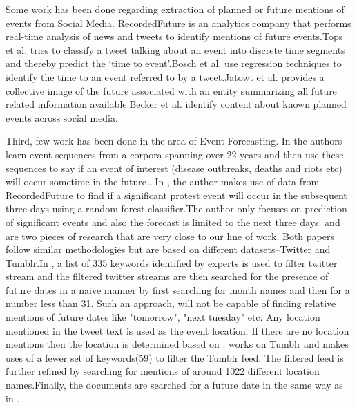 Some work has been done regarding extraction of planned or future mentions of events from Social Media. RecordedFuture\cite{recordedFuture}  is an analytics company that performs real-time analysis of news and tweets to identify mentions of future events.Tops et al.\cite{tops2013predicting} tries to classify a tweet talking about an event into discrete time segments and thereby predict the `time to event'.Bosch et al.\cite{bosch2013estm} use regression techniques to identify the time to an event referred to by a tweet.Jatowt et al. \cite{Jatowt:2011:ECE} provides a collective image of the future associated with an entity summarizing all future related information available.Becker et al.\cite{Becker:2012:ICP} identify content about known planned events across social media.

Third, few work has been done in the area of Event Forecasting. In \cite{Radinsky:2013:MWP} the authors learn event sequences from a corpora spanning over 22 years and then use these sequences to say if an event of interest (disease outbreaks, deaths and riots etc) will occur sometime in the future.\iffalse They only predict if an event of interest will happen in the future given the sequence of events seen but do not predict when/where(city level resolution) that event will happen \fi. In \cite{nathankallus}, the author makes use of data from RecordedFuture\cite{recordedFuture} to find if a  significant protest event will occur in the subsequent three days using a random forest classifier.The author only focuses on prediction of significant events and also the forecast is limited to the next three days.\cite{compton2013detecting} and \cite{xu2014civil} are two pieces of research  that are very close to our line of work. Both papers follow similar methodologies but are based on different datasets--Twitter and Tumblr.In \cite{compton2013detecting}, a list of 335 keywords identified by experts is used to filter twitter stream and the filtered twitter streams are then searched for the presence of future dates in a naive manner by first searching for month names and then for a number less than 31. Such an approach, will not be capable of finding relative mentions of future dates like "tomorrow", "next tuesday" etc. Any location mentioned in the tweet text is used as the event location. If there are no location mentions then the location is determined based on \cite{hrlgeocoder}.\cite{xu2014civil} works on Tumblr and makes uses of a fewer set of keywords(59) to filter the Tumblr feed. The filtered feed is further refined by searching for mentions of around 1022 different location names.Finally, the documents are searched for a future date in the same way as in \cite{compton2013detecting}.

